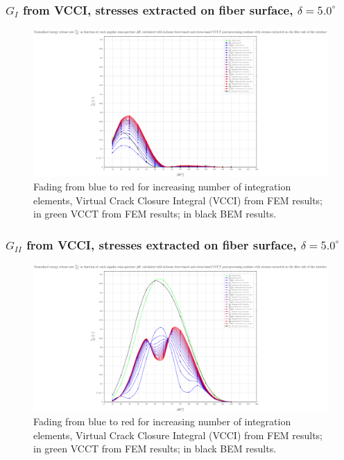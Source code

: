 \begin{frame}
\frametitle{\small $G_{I}$ from VCCI, stresses extracted on fiber surface, $\delta=5.0^{\circ}$}
\vspace{-0.5cm}
\centering
\captionsetup[figure]{font=scriptsize,labelfont=scriptsize}
\begin{figure}[!h]
\centering
\includegraphics[height=0.7\textheight]{2017-07-25_AbqRunSummary_SmallStrain_D05/pdf/2017-07-25_AbqRunSummary_SmallStrain_D05_F-SoF-VCCT_GI.pdf}
  \caption{\scriptsize Fading from blue to red for increasing number of integration elements, Virtual Crack Closure Integral (VCCI) from FEM results; in green VCCT from FEM results; in black BEM results.}
  \label{fig:res1}
\end{figure}
\end{frame}
\begin{frame}
\frametitle{\small $G_{II}$ from VCCI, stresses extracted on fiber surface, $\delta=5.0^{\circ}$}
\vspace{-0.5cm}
\centering
\captionsetup[figure]{font=scriptsize,labelfont=scriptsize}
\begin{figure}[!h]
\centering
\includegraphics[height=0.7\textheight]{2017-07-25_AbqRunSummary_SmallStrain_D05/pdf/2017-07-25_AbqRunSummary_SmallStrain_D05_F-SoF-VCCT_GII.pdf}
  \caption{\scriptsize Fading from blue to red for increasing number of integration elements, Virtual Crack Closure Integral (VCCI) from FEM results; in green VCCT from FEM results; in black BEM results.}
  \label{fig:res1}
\end{figure}
\end{frame}
